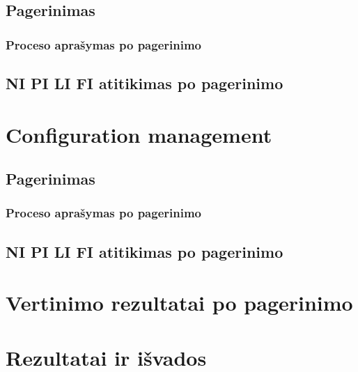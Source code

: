 \documentclass{VUMIFPSkursinis}
\begin{document}
		\subsection{Pagerinimas}
			\subsubsection{Proceso aprašymas po pagerinimo}
		\subsection{NI PI LI FI atitikimas po pagerinimo}
	\section{Configuration management}
		\subsection{Pagerinimas}
			\subsubsection{Proceso aprašymas po pagerinimo}
		\subsection{NI PI LI FI atitikimas po pagerinimo}
	\section{Vertinimo rezultatai po pagerinimo}
	\section{Rezultatai ir išvados}
\end{document}
